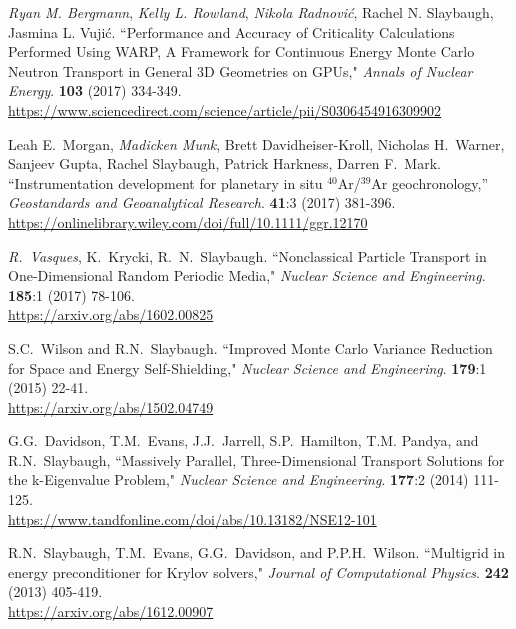 \begin{bibsection}
\item \textit{Ryan M. Bergmann}, \textit{Kelly L. Rowland}, \textit{Nikola Radnovi\'c}, Rachel N. Slaybaugh, Jasmina L. Vuji\'c. ``Performance and Accuracy of Criticality Calculations Performed Using WARP, A Framework for Continuous Energy Monte Carlo Neutron Transport in General 3D Geometries on GPUs," \textit{Annals of Nuclear Energy}. \textbf{103} (2017) 334-349.\\
\url{https://www.sciencedirect.com/science/article/pii/S0306454916309902}

\item Leah E.\ Morgan, \textit{Madicken Munk}, Brett Davidheiser-Kroll, Nicholas H.\ Warner, Sanjeev Gupta, Rachel Slaybaugh, Patrick Harkness, Darren F.\ Mark. ``Instrumentation development for planetary in situ $^{40}$Ar/$^{39}$Ar geochronology,'' \textit{Geostandards and Geoanalytical Research}. \textbf{41}:3 (2017) 381-396.\\
\url{https://onlinelibrary.wiley.com/doi/full/10.1111/ggr.12170}

\item \textit{R.\ Vasques}, K.\ Krycki, R.\ N.\ Slaybaugh. ``Nonclassical Particle Transport in One-Dimensional Random Periodic Media," \textit{Nuclear Science and Engineering}.  \textbf{185}:1 (2017) 78-106.\\
\url{https://arxiv.org/abs/1602.00825}

\item S.C.\ Wilson and R.N.\ Slaybaugh. ``Improved Monte Carlo Variance Reduction for Space and Energy Self-Shielding," \textit{Nuclear Science and Engineering}. \textbf{179}:1 (2015) 22-41.\\
\url{https://arxiv.org/abs/1502.04749}

\item G.G.\ Davidson, T.M.\ Evans, J.J.\ Jarrell, S.P.\ Hamilton, T.M. Pandya, and R.N.\ Slaybaugh, ``Massively Parallel, Three-Dimensional Transport Solutions for the k-Eigenvalue Problem," \textit{Nuclear Science and Engineering}. \textbf{177}:2 (2014) 111-125.\\
\url{https://www.tandfonline.com/doi/abs/10.13182/NSE12-101}

\item R.N.\ Slaybaugh, T.M.\ Evans, G.G.\ Davidson, and P.P.H.\ Wilson. ``Multigrid in energy preconditioner for Krylov solvers," \textit{Journal of Computational Physics}. \textbf{242} (2013) 405-419.\\
\url{https://arxiv.org/abs/1612.00907}


\end{bibsection}
